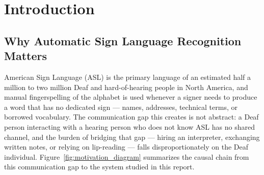 \documentclass[11pt,a4paper]{article}
\begin{document}
\section{Introduction}

\subsection{Why Automatic Sign Language Recognition Matters}
\label{sec:motivation}

American Sign Language (ASL) is the primary language of an estimated half a
million to two million Deaf and hard-of-hearing people in North America, and
manual fingerspelling of the alphabet is used whenever a signer needs to
produce a word that has no dedicated sign --- names, addresses, technical terms,
or borrowed vocabulary. The communication gap this creates is not abstract: a
Deaf person interacting with a hearing person who does not know ASL has no
shared channel, and the burden of bridging that gap --- hiring an interpreter,
exchanging written notes, or relying on lip-reading --- falls disproportionately
on the Deaf individual. Figure~\ref{fig:motivation_diagram} summarizes the
causal chain from this communication gap to the system studied in this report.
\end{document}
